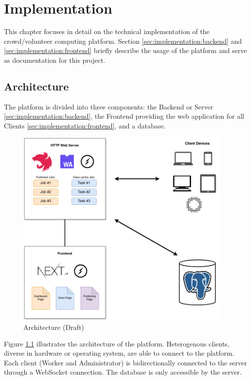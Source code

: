 \chapter{Implementation}
\label{ch:implementation}
This chapter focuses in detail on the technical implementation of the crowd/volunteer computing platform. Section \ref{sec:implementation:backend} and \ref{sec:implementation:frontend} briefly describe the usage of the platform and serve as documentation for this project.

\section{Architecture}
\label{sec:implementation:architecture}
The platform is divided into three components: the Backend or Server \ref{sec:implementation:backend}, the Frontend providing the web application for all Clients \ref{sec:implementation:frontend}, and a database.

\begin{figure}[htbp]
    \centering
    \includegraphics[width=0.95\textwidth]{gfx/figures/WebAssembly-MA.drawio.png}
    \caption{Architecture (Draft)}
    \label{fig:implementation:architecture}
\end{figure}

Figure \ref{fig:implementation:architecture} illustrates the architecture of the platform. Heterogenous clients, diverse in hardware or operating system, are able to connect to the platform. Each client (Worker and Administrator) is bidirectionally connected to the server through a WebSocket connection. The database is only accessible by the server.

